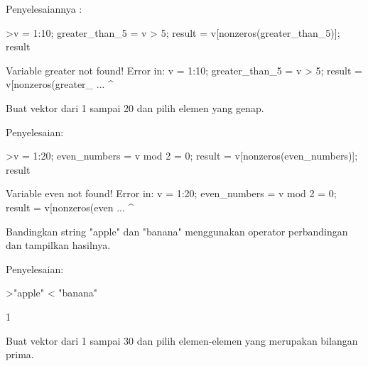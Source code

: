 \documentclass{article}
\begin{document}
\begin{eulernotebook}
\begin{eulercomment}
\begin{eulercomment}
\begin{eulercomment}
Penyelesaiannya :
\end{eulercomment}
\begin{eulerprompt}
>v = 1:10; greater_than_5 = v > 5; result = v[nonzeros(greater_than_5)]; result
\end{eulerprompt}
\begin{euleroutput}
  Variable greater not found!
  Error in:
  v = 1:10; greater_than_5 = v > 5; result = v[nonzeros(greater_ ...
                          ^
\end{euleroutput}
\begin{eulercomment}
Buat vektor dari 1 sampai 20 dan pilih elemen yang genap.

Penyelesaian:
\end{eulercomment}
\begin{eulerprompt}
>v = 1:20; even_numbers = v mod 2 = 0; result = v[nonzeros(even_numbers)]; result
\end{eulerprompt}
\begin{euleroutput}
  
  Variable even not found!
  Error in:
  v = 1:20; even_numbers = v mod 2 = 0; result = v[nonzeros(even ...
                         ^
\end{euleroutput}
\begin{eulercomment}
Bandingkan string "apple" dan "banana" menggunakan operator
perbandingan dan tampilkan hasilnya.


Penyelesaian:
\end{eulercomment}
\begin{eulerprompt}
>"apple" < "banana"
\end{eulerprompt}
\begin{euleroutput}
  1
\end{euleroutput}
\begin{eulercomment}
Buat vektor dari 1 sampai 30 dan pilih elemen-elemen yang merupakan
bilangan prima.



\end{eulercomment}
\end{eulercomment}
\end{eulercomment}
\end{eulernotebook}
\end{document}
